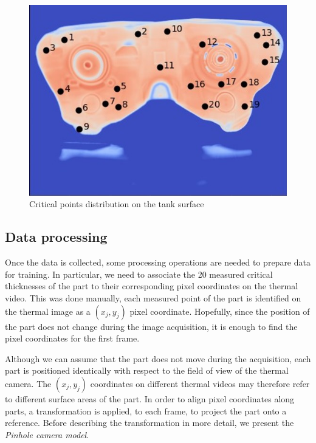 \begin{figure}
\centering
\includegraphics[scale=1]{images/chapter_4/critical_points.jpg}
\caption{Critical points distribution on the tank surface}
\label{fig:critical_points}
\end{figure}


\subsection{Data processing}

Once the data is collected, some processing operations are needed to prepare data for training. In particular, we need to associate the 20  measured critical thicknesses of the part to their corresponding pixel coordinates on the thermal video. This was done manually, each measured point of the part is identified on the thermal image as a $(x_j, y_j)$ pixel coordinate. Hopefully, since the position of the part does not change during the image acquisition, it is enough to find the pixel coordinates for the first frame. 

Although we can assume that the part does not move during the acquisition, each part is positioned identically with respect to the field of view of the thermal camera. The  $(x_j, y_j)$ coordinates on different thermal videos may therefore refer to different surface areas of the part. In order to align pixel coordinates along parts, a transformation is applied, to each frame, to project the part onto a reference. Before describing the transformation in more detail, we present the \textit{Pinhole camera model}. 

